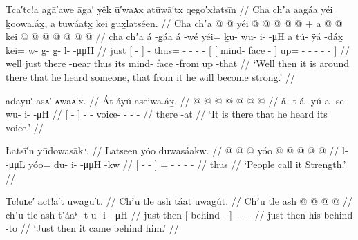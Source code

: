 \ex\label{ex:93-20-heard-someone}%
%
\begingl
	\glpreamble	Tca′tc!a ag̣ā′awe āg̣a′ yêk ū′waᴀx atūwā′tx qeg̣o′xłatsīn //
	\glpreamble	Cha chʼa aag̱áa yéi ḵoowa.áx̱, a tuwáatx̱ kei gux̱latséen. //
	\gla	Cha chʼa {}  @ {} {}  @ {}
		yéi @  @ {} @ {} @ {} @ {} +
		{} {} a  @ {} @ {} {}
			kei @  @ {} @ {} @ {} @ {} @ {} @ {} {} //
	\glb	cha chʼa {} á -g̱áa {} á -wé
		yéi= ḵu- wu- i-  -μH
		{} {} a tú- ÿá -dáx̱ {}
			kei= w- g- g̱- l-  -μμH {} {} //
	\glc	{} just {}[  - {}]  -
		thus= - - -  -
		{}[ {}[  mind- face - {}]
			up= - - - -  - \· {}] //
	\gld	well just {} there -near {}  {}
		thus  {} {} {} {}
		{} {} its mind- face -from {}
			up  {} {} {} {} {} -that {} //
	\glft	‘Well then it is around there that he heard someone, that from it he will become strong.’
		//
\endgl
\xe

\ex\label{ex:93-21-heard-someone}%
%
\begingl
	\glpreamble	adayu′ asᴀ′ ᴀwaᴀ′x. //
	\glpreamble	Át áyú aseiwa.áx̱. //
	\gla	{}  @ {} {}  @ {}
		 @ {} @ {} @ {} @ {} @ {} //
	\glb	{} á -t {} á -yú
		a- se- wu- i-  -μH //
	\glc	{}[  - {}]  -
		- voice- - -  - //
	\gld	{} there -at {}  {}
		 {} {} {} {} {} //
	\glft	‘It is there that he heard its voice.’
		//
\endgl
\xe

\ex\label{ex:93-22-called-strength}%
%
\begingl
	\glpreamble	Łatsī′n yūdowasākᵘ. //
	\glpreamble	Latseen yóo duwasáakw. //
	\gla	{}  @ {} @ {} @ {} {} 
		yóo @  @ {} @ {} @ {} @ {} //
	\glb	{} l-  -μμL {} {}
		yóo= du- i-  -μμH -kw //
	\glc	{}[ -  - \· {}]
		= - -  - - //
	\gld	{}  {} {} {} {}
		thus  {} {} {} {} //
	\glft	‘People call it Strength.’
		//
\endgl
\xe

\ex\label{ex:93-23-came-behind}%
%
\begingl
	\glpreamble	Tc!uʟe′ act!ā′t uwagu′t. //
	\glpreamble	Chʼu tle ash táat uwagút. //
	\gla	Chʼu tle {} ash  @ {} {}
		 @ {} @ {} @ {} //
	\glb	chʼu tle {} ash tʼáaᵏ -t {}
		u- i-  -μH //
	\glc	just then {}[  behind - {}]
		- -  - //
	\gld	just then {} his behind -to {}
		 {} {} {} //
	\glft	‘Just then it came behind him.’
		//
\endgl
\xe

